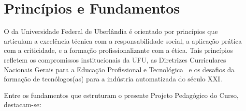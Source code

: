 \chapter{Princípios e Fundamentos}
\label{chp:principios}

O \ppccurso da Universidade Federal de Uberlândia é orientado por princípios que articulam a excelência técnica com a responsabilidade social, a aplicação prática com a criticidade, e a formação profissionalizante com a ética. Tais princípios refletem os compromissos institucionais da UFU, as Diretrizes Curriculares Nacionais Gerais para a Educação Profissional e Tecnológica~\cite{cne_cp_1_2021} e os desafios da formação de tecnólogos(as) para a indústria automatizada do século XXI.

Entre os fundamentos que estruturam o presente Projeto Pedagógico do Curso, destacam-se:

